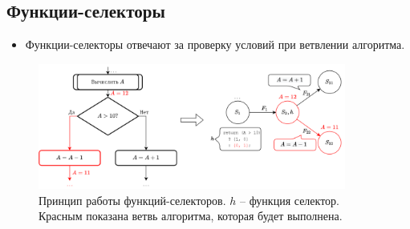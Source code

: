 \subsection{Функции-селекторы}

\begin{frame}
	\begin{itemize}
		\item Функции-селекторы отвечают за проверку условий при ветвлении алгоритма.
	\end{itemize}

	\begin{figure}
		\centering
		\includegraphics[width=0.9\textwidth]{images/illustration.selector.png}
		\caption{Принцип работы функций-селекторов. $h$ -- функция селектор. Красным показана ветвь алгоритма, которая будет выполнена.}
	\end{figure}
\end{frame}

